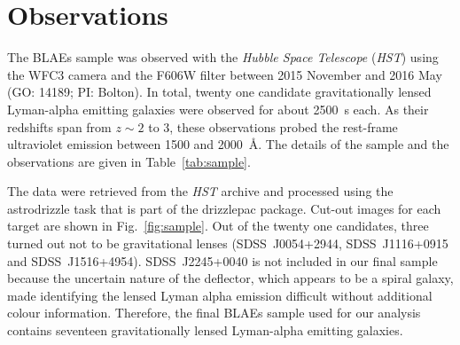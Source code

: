 \documentclass[a4paper,fleqn,usenatbib]{mnras}
\begin{document}
\section{Observations}

The BLAEs sample was observed with the {\it Hubble Space Telescope} ({\it HST}) using the WFC3 camera and the F606W filter between 2015 November and 2016 May (GO: 14189; PI: Bolton). In total, twenty one candidate gravitationally lensed Lyman-alpha emitting galaxies were observed for about 2500~s each. As their redshifts span from $z \sim 2$ to 3, these observations probed the rest-frame ultraviolet emission between 1500 and 2000~\AA. The details of the sample and the observations are given in Table~\ref{tab:sample}.

The data were retrieved from the {\it HST} archive and processed using the {\sc astrodrizzle} task that is part of the {\sc drizzlepac} package. Cut-out images for each target are shown in Fig.~\ref{fig:sample}. Out of the twenty one candidates, three turned out not to be gravitational lenses (SDSS~J0054+2944, SDSS~J1116+0915 and SDSS~J1516+4954). SDSS~J2245+0040 is not included in our final sample because the uncertain nature of the deflector, which appears to be a spiral galaxy, made identifying the lensed Lyman alpha emission difficult without additional colour information. Therefore, the final BLAEs sample used for our analysis contains seventeen gravitationally lensed Lyman-alpha emitting galaxies.
\end{document}
